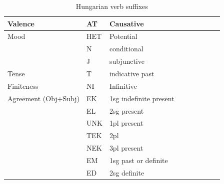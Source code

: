 \documentclass[11pt,letterpaper]{article}
\begin{document}
\begin{table}
    \centering
    \begin{tabular}{lllllllll}
    \hline
Valence	    & AT & Causative \\ \hline
Mood	    & HET & Potential \\
         & N & conditional \\
         & J & subjunctive \\
\hline
Tense& T & indicative past \\
         \hline
Finiteness  & NI & Infinitive \\
\hline
Agreement (Obj+Subj)         & EK & 1sg indefinite present\\
         & EL & 2sg present\\
         & UNK & 1pl present\\
         & TEK & 2pl\\
         & NEK & 3pl present\\
         & EM & 1sg past or definite \\
         & ED & 2sg definite \\
         \hline
    \end{tabular}
    \caption{Hungarian verb suffixes}
    \label{tab:hungarian-suffixes}
\end{table}
\end{document}
